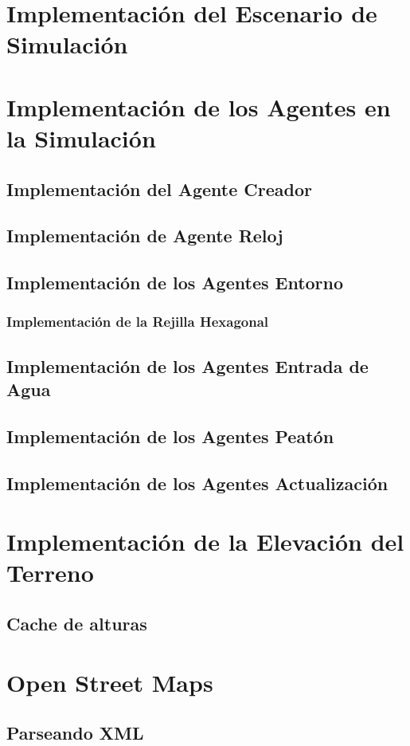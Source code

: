 \section*{Implementación del Escenario de Simulación}
\section*{Implementación de los Agentes en la Simulación}
\subsection*{Implementación del Agente Creador}
\subsection*{Implementación de Agente Reloj}
\subsection*{Implementación de los Agentes Entorno}
\subsubsection*{Implementación de la Rejilla Hexagonal}
\subsection*{Implementación de los Agentes Entrada de Agua}
\subsection*{Implementación de los Agentes Peatón}
\subsection*{Implementación de los Agentes Actualización}
\section*{Implementación de la Elevación del Terreno}
\subsection*{Cache de alturas}
\section*{Open Street Maps}
\subsection*{Parseando XML}
